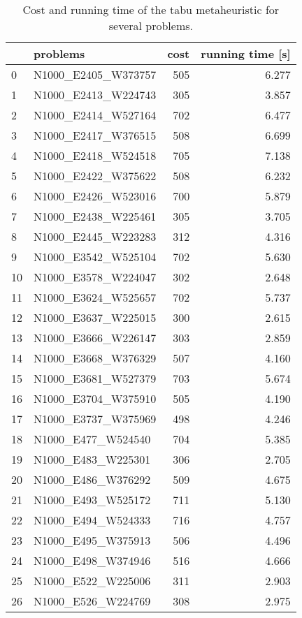 \begin{table}
\centering
\begin{tabular}{llrr}
\toprule
{} &             problems &  cost &  running time [s] \\
\midrule
0  &  N1000\_E2405\_W373757 &   505 &             6.277 \\
1  &  N1000\_E2413\_W224743 &   305 &             3.857 \\
2  &  N1000\_E2414\_W527164 &   702 &             6.477 \\
3  &  N1000\_E2417\_W376515 &   508 &             6.699 \\
4  &  N1000\_E2418\_W524518 &   705 &             7.138 \\
5  &  N1000\_E2422\_W375622 &   508 &             6.232 \\
6  &  N1000\_E2426\_W523016 &   700 &             5.879 \\
7  &  N1000\_E2438\_W225461 &   305 &             3.705 \\
8  &  N1000\_E2445\_W223283 &   312 &             4.316 \\
9  &  N1000\_E3542\_W525104 &   702 &             5.630 \\
10 &  N1000\_E3578\_W224047 &   302 &             2.648 \\
11 &  N1000\_E3624\_W525657 &   702 &             5.737 \\
12 &  N1000\_E3637\_W225015 &   300 &             2.615 \\
13 &  N1000\_E3666\_W226147 &   303 &             2.859 \\
14 &  N1000\_E3668\_W376329 &   507 &             4.160 \\
15 &  N1000\_E3681\_W527379 &   703 &             5.674 \\
16 &  N1000\_E3704\_W375910 &   505 &             4.190 \\
17 &  N1000\_E3737\_W375969 &   498 &             4.246 \\
18 &   N1000\_E477\_W524540 &   704 &             5.385 \\
19 &   N1000\_E483\_W225301 &   306 &             2.705 \\
20 &   N1000\_E486\_W376292 &   509 &             4.675 \\
21 &   N1000\_E493\_W525172 &   711 &             5.130 \\
22 &   N1000\_E494\_W524333 &   716 &             4.757 \\
23 &   N1000\_E495\_W375913 &   506 &             4.496 \\
24 &   N1000\_E498\_W374946 &   516 &             4.666 \\
25 &   N1000\_E522\_W225006 &   311 &             2.903 \\
26 &   N1000\_E526\_W224769 &   308 &             2.975 \\
\bottomrule
\end{tabular}
\caption{Cost and running time of the tabu metaheuristic for several problems.}
\label{table:tabu-results}
\end{table}

